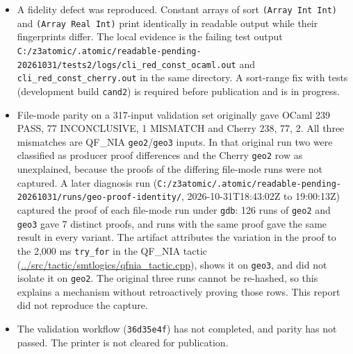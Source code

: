 \documentclass[10pt,a4paper]{article}
\begin{document}
\begin{itemize}\setlength{\itemsep}{1pt}\setlength{\parskip}{0pt}

\item A fidelity defect was reproduced. Constant arrays of sort \texttt{(\allowbreak{}Array Int Int)} and \texttt{(\allowbreak{}Array Real Int)} print identically in readable output while their fingerprints differ. The local evidence is the failing test output \texttt{C:\allowbreak{}/\allowbreak{}z3atomic/\allowbreak{}.\allowbreak{}atomic/\allowbreak{}readable-{}\allowbreak{}pending-{}\allowbreak{}20261031/\allowbreak{}tests2/\allowbreak{}logs/\allowbreak{}cli\_\allowbreak{}red\_\allowbreak{}const\_\allowbreak{}ocaml.\allowbreak{}out} and \texttt{cli\_\allowbreak{}red\_\allowbreak{}const\_\allowbreak{}cherry.\allowbreak{}out} in the same directory. A sort-range fix with tests (development build \texttt{cand2}) is required before publication and is in progress.

\item File-mode parity on a 317-input validation set originally gave OCaml 239 PASS, 77 INCONCLUSIVE, 1 MISMATCH and Cherry 238, 77, 2. All three mismatches are QF\_NIA \texttt{geo2}/\texttt{geo3} inputs. In that original run two were classified as producer proof differences and the Cherry \texttt{geo2} row as unexplained, because the proofs of the differing file-mode runs were not captured. A later diagnosis run (\texttt{C:\allowbreak{}/\allowbreak{}z3atomic/\allowbreak{}.\allowbreak{}atomic/\allowbreak{}readable-{}\allowbreak{}pending-{}\allowbreak{}20261031/\allowbreak{}runs/\allowbreak{}geo-{}\allowbreak{}proof-{}\allowbreak{}identity/\allowbreak{}}, 2026-10-31T18:43:02Z to 19:00:13Z) captured the proof of each file-mode run under \texttt{gdb}: 126 runs of \texttt{geo2} and \texttt{geo3} gave 7 distinct proofs, and runs with the same proof gave the same result in every variant. The artifact attributes the variation in the proof to the 2,000 ms \texttt{try\_\allowbreak{}for} in the QF\_NIA tactic (\href{https://github.com/Z3Prover/z3/blob/8fbb275aba0472e862e289c7af1331b3bd5d512c/src/tactic/smtlogics/qfnia_tactic.cpp\#L130-L133}{.\allowbreak{}.\allowbreak{}/\allowbreak{}src/\allowbreak{}tactic/\allowbreak{}smtlogics/\allowbreak{}qfnia\_\allowbreak{}tactic.\allowbreak{}cpp}), shows it on \texttt{geo3}, and did not isolate it on \texttt{geo2}. The original three runs cannot be re-hashed, so this explains a mechanism without retroactively proving those rows. This report did not reproduce the capture.

\item The validation workflow (\texttt{36d35e4f}) has not completed, and parity has not passed. The printer is not cleared for publication.

\end{itemize}
\end{document}
